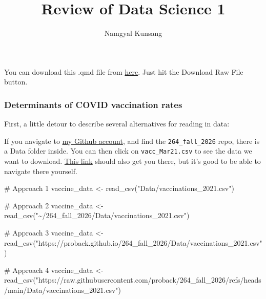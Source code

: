 \documentclass[
  letterpaper,
  DIV=11,
  numbers=noendperiod]{scrartcl}
\title{Review of Data Science 1}
\author{Namgyal Kunsang}
\date{}
\newenvironment{Shaded}{\begin{snugshade}}{\end{snugshade}}
\newcommand{\CommentTok}[1]{\textcolor[rgb]{0.37,0.37,0.37}{#1}}
\newcommand{\FunctionTok}[1]{\textcolor[rgb]{0.28,0.35,0.67}{#1}}
\newcommand{\NormalTok}[1]{\textcolor[rgb]{0.00,0.23,0.31}{#1}}
\newcommand{\OtherTok}[1]{\textcolor[rgb]{0.00,0.23,0.31}{#1}}
\newcommand{\StringTok}[1]{\textcolor[rgb]{0.13,0.47,0.30}{#1}}
\newcommand*\circled[1]{\tikz[baseline=(char.base)]{
          \node[shape=circle,draw,inner sep=1pt] (char) {{\scriptsize#1}};}}
\begin{document}
\maketitle


You can download this .qmd file from
\href{https://github.com/proback/264_fall_2026/blob/main/01_review164.qmd}{here}.
Just hit the Download Raw File button.

\subsubsection{Determinants of COVID vaccination
rates}\label{determinants-of-covid-vaccination-rates}

First, a little detour to describe several alternatives for reading in
data:

If you navigate to \href{https://github.com/proback}{my Github account},
and find the \texttt{264\_fall\_2026} repo, there is a Data folder
inside. You can then click on \texttt{vacc\_Mar21.csv} to see the data
we want to download.
\href{https://github.com/proback/264_fall_2026/blob/main/Data/vaccinations_2021.csv}{This
link} should also get you there, but it's good to be able to navigate
there yourself.

\protect{}\label{annotated-cell-1}%
\begin{Shaded}
\begin{Highlighting}[]
\CommentTok{\# Approach 1}
\NormalTok{vaccine\_data }\OtherTok{\textless{}{-}} \FunctionTok{read\_csv}\NormalTok{(}\StringTok{"Data/vaccinations\_2021.csv"}\NormalTok{) }\hspace*{\fill}\NormalTok{\circled{1}}

\CommentTok{\# Approach 2}
\NormalTok{vaccine\_data }\OtherTok{\textless{}{-}} \FunctionTok{read\_csv}\NormalTok{(}\StringTok{"\textasciitilde{}/264\_fall\_2026/Data/vaccinations\_2021.csv"}\NormalTok{) }\hspace*{\fill}\NormalTok{\circled{2}}

\CommentTok{\# Approach 3}
\NormalTok{vaccine\_data }\OtherTok{\textless{}{-}} \FunctionTok{read\_csv}\NormalTok{(}\StringTok{"https://proback.github.io/264\_fall\_2026/Data/vaccinations\_2021.csv"}\NormalTok{) }\hspace*{\fill}\NormalTok{\circled{3}}

\CommentTok{\# Approach 4}
\NormalTok{vaccine\_data }\OtherTok{\textless{}{-}} \FunctionTok{read\_csv}\NormalTok{(}\StringTok{"https://raw.githubusercontent.com/proback/264\_fall\_2026/refs/heads/main/Data/vaccinations\_2021.csv"}\NormalTok{) }\hspace*{\fill}\NormalTok{\circled{4}}
\end{Highlighting}
\end{Shaded}
\end{document}
